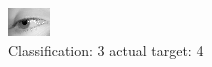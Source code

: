 \begin{figure}[h!]
\begin{center}
\includegraphics[width=0.60\columnwidth]{figures/ID2961_class_3_target_4.png}
\end{center}
\caption{ Classification: 3 actual target: 4}
\label{fig:ID2961_class_3_target_4}
\end{figure}
